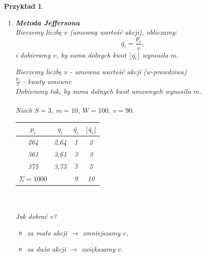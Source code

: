 \documentclass[12pt,a4paper]{article}
\theoremstyle{break}
\newtheorem{example}{Przykład}[section]
\begin{document}
\begin{example}
\begin{enumerate}[1)]
			\[
			\begin{array}{|c|c|c|c|}
				\hline
				p_i & q_i & \lfloor q_i \rfloor & \text{Wynik} \\\hline
				7264183 & 37606 & 37,606 & 38 \\
				694466 & 3595 & 3,595 & 3 \\
				-- & -- & -- & -- \\\hline
			\end{array}\Rightarrow\begin{array}{|c|c|c|c|}
				\hline
				p_i & q_i & \lfloor q_i \rfloor & \text{Wynik} \\\hline
				7264183 & 37606 & 37,606 & 38 \\
				694466 & 3595 & 3,595 & 3 \\
				-- & -- & -- & -- \\\hline
			\end{array}
			\]
			
			\item \textbf{Metoda Jeffersona}\\
			Bierzemy liczbę $v$ (umowną wartość akcji), obliczamy:
			\[
			\bar{q_i} = \frac{p_i}{v},
			\]
			i dobieramy $v$, by suma dolnych kwot $\lfloor \bar{q_i} \rfloor$ wynosiła $m$.

			Bierzemy liczbę $v$ - umowna wartość akcji (w-prawdziwa)\\
			$\frac{p_i}{v}$ - kwoty umowne\\
			Dobieramy tak, by suma dolnych kwot umownych wynosiła $m$.\\\\
			
			Niech $S=3,\: m=10,\: W=100,\: v=90$.\\
			\begin{tabular}{|c|c|c|c|}
				\hline
				$p_i$ & $q_i$ & $\bar{q_i}$ & $\lfloor \bar{q_i} \rfloor$ \\
				\hline
				264 & 2,64 & 1 & 2 \\
				361 & 3,61 & 3 & 3 \\
				375 & 3,75 & 5 & 5 \\
				\hline
				$\Sigma=1000$ & & 9 & 10 \\
				\hline
			\end{tabular}\\\\
			Jak dobrać $v$?
			\begin{itemize}
				\item za mało akcji $\rightarrow$ zmniejszamy $v$,
				\item za dużo akcji $\rightarrow$ zwiększamy $v$.
			\end{itemize}
			

\end{enumerate}
\end{example}
\end{document}
